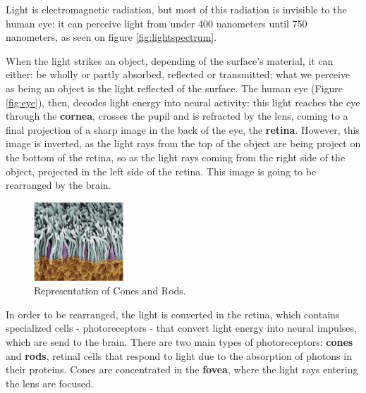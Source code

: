 %
Light is electromagnetic radiation, but most of this radiation is invisible to the human eye: it can
perceive light from under 400 nanometers until 750 nanometers, as seen on figure \ref{fig:lightspectrum}. \par
When the light strikes an object, depending of the surface’s material, it can either: be wholly or partly
absorbed, reflected or transmitted; what we perceive as being an object is the light reflected of the
surface. The human eye (Figure \ref{fig:eye}), then, decodes light energy into neural activity:
this light reaches the eye through the \textbf{cornea}, crosses the pupil and is refracted by the lens, coming to a final
projection of a sharp image in the back of the eye, the \textbf{retina}. However, this image is
inverted, as the light rays from the top of the object are being project on the bottom of the retina,
so as the light rays coming from the right side of the object, projected in the left side of the
retina. This image is going to be rearranged by the brain.  \par
%
\begin{figure}
	\centering
    \vspace{-\baselineskip}
	\includegraphics[width=0.3\textwidth]{images/background/Eye_ConesRods.png}
    \caption[Cones and Rods]{Representation of Cones and Rods.\protect\footnotemark{}}
    \label{fig:conesrods}
\end{figure}
%
In order to be rearranged, the light is converted in the retina, which contains specialized cells
- photoreceptors - that convert light energy into neural impulses,
which are send to the brain. There are two main types of photoreceptors: \textbf{cones} and
\textbf{rods},
retinal cells that respond to light due to the absorption of photons in their proteins. Cones are concentrated in the \textbf{fovea}, where the light rays
entering the lens are focused. \par
